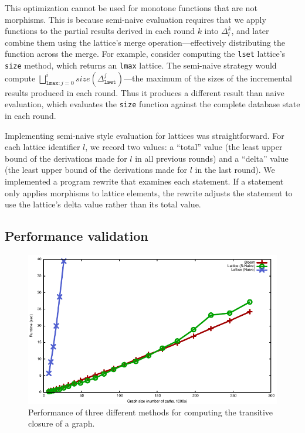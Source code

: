 This optimization cannot be used for monotone functions that are not
morphisms. This is because semi-naive evaluation requires that we apply
functions to the partial results derived in each round $k$ into $\Delta_l^k$,
and later combine them using the lattice's merge operation---effectively
distributing the function across the merge.  For example, consider computing the
\texttt{lset} lattice's \texttt{size} method, which returns an \texttt{lmax}
lattice. The semi-naive strategy would compute
$\bigsqcup_{\mathtt{lmax}:j=0}^i size(\Delta^j_{\mathtt{lset}})$---the maximum of
the sizes of the incremental results produced in each round.  Thus it produces a
different result than naive evaluation, which evaluates the \texttt{size}
function against the complete database state in each round.

Implementing semi-naive style evaluation for lattices was straightforward. For
each lattice identifier $l$, we record two values: a ``total'' value (the least
upper bound of the derivations made for $l$ in all previous rounds) and a
``delta'' value (the least upper bound of the derivations made for $l$ in the
last round). We implemented a program rewrite that examines each \lang
statement. If a statement only applies morphisms to lattice elements, the
rewrite adjusts the statement to use the lattice's delta value rather than its
total value.


\subsection{Performance validation}
\label{sec:lattice-perf}

\begin{figure}[t]
\includegraphics[width=\linewidth]{fig/sn_perf}
\caption{Performance of three different methods for computing the
  transitive closure of a graph.}
\label{fig:tc-perf-graph}
\end{figure}

